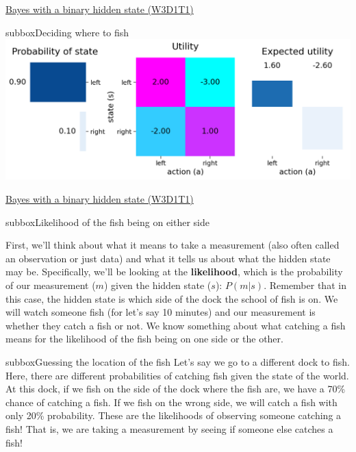 \begin{textbox}{\href{https://compneuro.neuromatch.io/tutorials/W3D1_BayesianDecisions/student/W3D1_Tutorial1.html}{Bayes with a binary hidden state (W3D1T1)} }
\begin{subbox}{subbox}{Deciding where to fish}
\centering
\includegraphics[scale=0.23]{Figures/BD/BD_Figure1.png}

\end{subbox}
\end{textbox}
\begin{textbox}{\href{https://compneuro.neuromatch.io/tutorials/W3D1_BayesianDecisions/student/W3D1_Tutorial1.html}{Bayes with a binary hidden state (W3D1T1)} }
\begin{subbox}{subbox}{Likelihood of the fish being on either side}
\scriptsize

First, we'll think about what it means to take a measurement (also often called an observation or just data) and what it tells us about what the hidden state may be. Specifically, we'll be looking at the \textbf{likelihood}, which is the probability of our measurement ($m$) given the hidden state ($s$): $P(m | s)$. Remember that in this case, the hidden state is which side of the dock the school of fish is on.
We will watch someone fish (for let's say 10 minutes) and our measurement is whether they catch a fish or not. We know something about what catching a fish means for the likelihood of the fish being on one side or the other.

\end{subbox}

\begin{subbox}{subbox}{Guessing the location of the fish}
\scriptsize
Let's say we go to a different dock to fish. Here, there are different probabilities of catching fish given the state of the world. At this dock, if we fish on the side of the dock where the fish are, we have a 70\% chance of catching a fish. If we fish on the wrong side, we will catch a fish with only 20\% probability. These are the likelihoods of observing someone catching a fish! That is, we are taking a measurement by seeing if someone else catches a fish!


\end{subbox}
\end{textbox}

